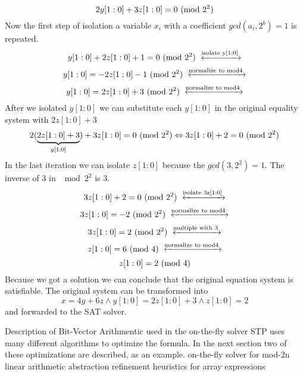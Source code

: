 $$2y[1 : 0] + 3z[1 : 0] = 0\ (\mathrm{mod}\ 2^2)$$
Now the first step of isolation a variable $x_i$ with a coefficient $gcd(a_i, 2^b)=1$ is repeated.
$$y[1 : 0] + 2z[1 : 0] + 1 = 0 \Mod{2^2} \xleftrightarrow{\text{isolate y[1:0]}}$$
$$y[1 : 0] = -2z[1 : 0] -1 \Mod{2^2} \xleftrightarrow{\text{normalize to mod4}}$$
$$y[1 : 0] = 2z[1 : 0] +3 \Mod{2^2} \xleftrightarrow{\text{normalize to mod4}}$$
After we isolated $y[1 : 0] $ we can substitute each $y[1 : 0] $ in the original equality system with $2z[1:0]+3$
$$2(\underbrace{2z[1:0]+3}_{y[1:0]}) + 3z[1 : 0] = 0\ (\mathrm{mod}\ 2^2)  \Leftrightarrow 3z[1:0] + 2 = 0 \ (\mathrm{mod}\ 2^2)$$
In the last iteration we can isolate $z[1:0]$ because the $gcd(3,2^2) = 1$. The inverse of 3 in $\mod{2^2}$ is 3.
$$3z[1:0] + 2 = 0 \Mod{2^2} \xleftrightarrow{\text{isolate 3z[1:0]}}$$
$$3z[1:0]=-2  \Mod{2^2}   \xleftrightarrow{\text{normalize to mod4}}$$
$$3z[1:0]=2  \Mod{2^2}   \xleftrightarrow{\text{multiple with 3}}$$
$$z[1:0]=6  \Mod{4}  \xleftrightarrow{\text{normalize to mod4}}$$
$$z[1:0]=2  \ (\mathrm{mod}\ 4)$$
Because we got a solution we can conclude that the original equation system is satisfiable.
The original system can be transformed into $$x = 4y + 6z \land y[1 : 0] = 2z[1 : 0] + 3 \land z[1 : 0] = 2$$ and forwarded to the SAT solver.

Description of Bit-Vector Arithmentic used in the on-the-fly solver\cite{10.1007/978-3-540-71209-1_28}
STP uses many different algorithms to optimize the formula. In the next section two of these optimizations are described, as an example.
on-the-fly solver for mod-2n linear arithmetic
abstraction refinement heuristics for array expressions 